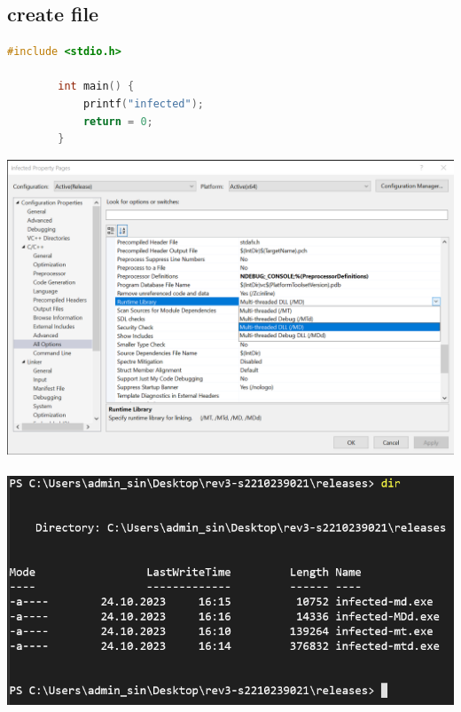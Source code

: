 \documentclass{article}
\begin{document}
	\subsection{create file}
		\begin{lstlisting}[language=c]
		#include <stdio.h>
		
		int main() {
			printf("infected");
			return = 0;
		}
	\end{lstlisting}
	\includegraphics[width=0.7\linewidth]{pictures/1. setting runtime library.png}\\
	\\
	\includegraphics[width=0.5\linewidth]{pictures/1. all files.png}\\
	
	\pagebreak
	
\end{document}
